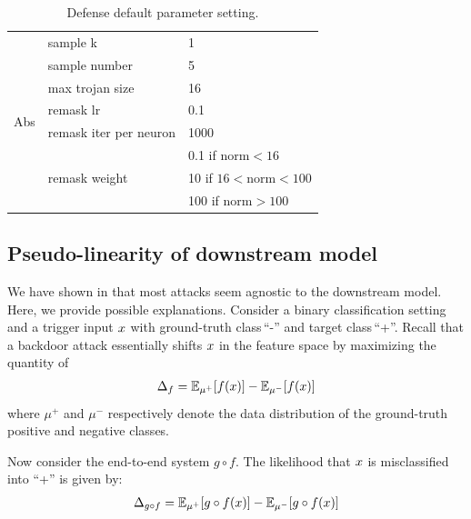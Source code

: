 \documentclass[compsoc,conference,a4paper,10pt,times]{IEEEtran}
\newcommand{\abs}{{\sc Abs}\xspace}
\begin{document}
\begin{table}[!ht]
{\begin{tabular}{c|l|l}
            \multirow{8}{*}{\abs}      & sample k                               & 1                   \\
                                      & sample number                          & 5                   \\
                                      & max trojan size                        & 16                  \\
                                      & remask lr                              & 0.1                 \\
                                      & remask iter per neuron                 & 1000                \\\cline{2-3}
                                      & \multirow{3}{*}{remask weight}         & 0.1 if norm$<16$       \\
                                      &                                        & 10 if $16<$norm$<100$    \\
                                      &                                        & 100 if norm$>100$      \\
        \end{tabular}
        \caption{Defense default parameter setting. \label{tab:defense_param}}}
\end{table}



\subsection{Pseudo-linearity of downstream model}

We have shown in  that most attacks seem agnostic to the downstream model. Here, we provide possible explanations. Consider a binary classification setting and a trigger input $x$ with ground-truth class\,``-'' and target class\,``+''.
Recall that a backdoor attack essentially shifts $x$ in the feature space by maximizing the quantity of
\begin{align}
\Delta_{f} = \mathbb{E}_{\mu^+}[f(x)] - \mathbb{E}_{\mu^-}[f(x)]
\end{align}
where $\mu^+$ and $\mu^-$ respectively denote the data distribution of the ground-truth positive and negative classes.

Now consider the end-to-end system $g\circ f$. The likelihood that $x$ is misclassified into ``+'' is given by:
\begin{align}
\Delta_{g\circ f} = \mathbb{E}_{\mu^+}[g\circ f(x)] - \mathbb{E}_{\mu^-}[g\circ f(x)]
\end{align}
\end{document}
